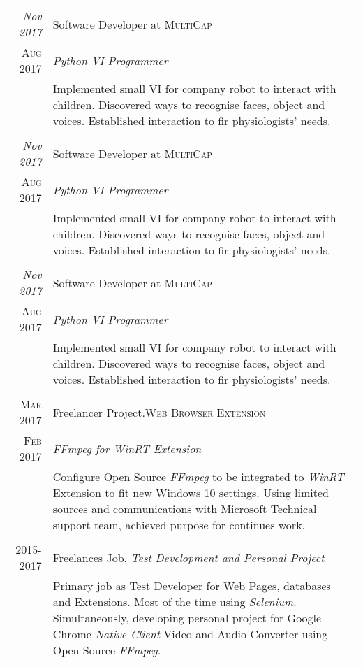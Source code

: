 \documentclass[a4paper,12pt]{article}
\begin{document}
{
        {
\begin{tabular}{r|p{11cm}}
    \emph{Nov 2017} & Software Developer at \textsc{MultiCap} \\\textsc{Aug 2017}&\emph{Python VI Programmer}\\&\footnotesize{Implemented small VI for company robot to interact with children. Discovered ways to recognise faces, object and voices. Established interaction to fir physiologists' needs.}\\\multicolumn{2}{c}{}  \\	[1pc]
 
    \emph{Nov 2017} & Software Developer at \textsc{MultiCap} \\\textsc{Aug 2017}&\emph{Python VI Programmer}\\&\footnotesize{Implemented small VI for company robot to interact with children. Discovered ways to recognise faces, object and voices. Established interaction to fir physiologists' needs.}\\\multicolumn{2}{c}{} \\ [1pc]
    
	\emph{Nov 2017} & Software Developer at \textsc{MultiCap} \\\textsc{Aug 2017}&\emph{Python VI Programmer}\\&\footnotesize{Implemented small VI for company robot to interact with children. Discovered ways to recognise faces, object and voices. Established interaction to fir physiologists' needs.}\\\multicolumn{2}{c}{}
    
    \\ [1pc]
	\textsc{Mar 2017} & Freelancer Project.\textsc{Web Browser Extension} \\\textsc{Feb 2017}&\emph{FFmpeg for WinRT Extension}\\&\footnotesize{Configure Open Source \textit{FFmpeg} to be integrated to \textit{WinRT} Extension to fit new Windows 10 settings. Using limited sources and communications with Microsoft Technical support team, achieved purpose for continues work.}\\\multicolumn{2}{c}{} \\ [1pc]
	\textsc{2015-2017} & Freelances Job, \emph{Test Development and Personal Project}\\&\footnotesize{Primary job as Test Developer for Web Pages, databases and Extensions. Most of the time using \textit{Selenium}. Simultaneously, developing personal project for Google Chrome \textit{Native Client} Video and Audio Converter using Open Source \textit{FFmpeg}.}
	

\end{tabular}}}
\end{document}

